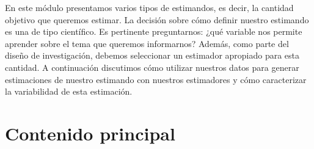 \documentclass[12pt,spanish,]{book}
\begin{document}
En este módulo presentamos varios tipos de estimandos, es decir, la cantidad objetivo que queremos estimar. La decisión sobre cómo definir nuestro estimando es una de tipo científico. Es pertinente preguntarnos: ¿qué variable nos permite aprender sobre el tema que queremos informarnos? Además, como parte del diseño de investigación, debemos seleccionar un estimador apropiado para esta cantidad. A continuación discutimos cómo utilizar nuestros datos para generar estimaciones de nuestro estimando con nuestros estimadores y cómo caracterizar la variabilidad de esta estimación.

\hypertarget{contenido-principal-4}{%
\section{Contenido principal}\label{contenido-principal-4}}
\end{document}
